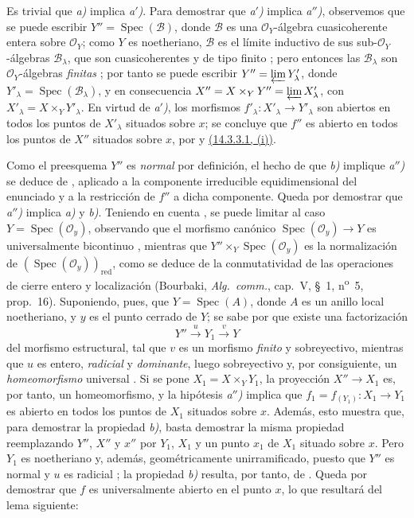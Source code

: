 Es trivial que \emph{a)} implica \emph{a$'$)}.
Para demostrar que \emph{a$'$)} implica \emph{a$''$)}, observemos que se puede escribir $Y''=\operatorname{Spec}(\mathcal B)$, donde $\mathcal B$ es una $\mathcal O_Y$-álgebra cuasicoherente entera sobre $\mathcal O_Y$; como $Y$ es noetheriano, $\mathcal B$ es el límite inductivo de sus sub-$\mathcal O_Y$-álgebras $\mathcal B_\lambda$, que son cuasicoherentes y de tipo finito ; pero entonces las $\mathcal B_\lambda$ son $\mathcal O_Y$-álgebras \emph{finitas} ; por tanto se puede escribir $Y''=\varprojlim Y'_\lambda$, donde $Y'_\lambda=\operatorname{Spec}(\mathcal B_\lambda)$, y en consecuencia $X''=X\times_Y Y''=\varprojlim X'_\lambda$, con $X'_\lambda=X\times_Y Y'_\lambda$.
En virtud de \emph{a$'$)}, los morfismos $f'_\lambda:X'_\lambda\to Y'_\lambda$ son abiertos en todos los puntos de $X'_\lambda$ situados sobre $x$; se concluye que $f''$ es abierto en todos los puntos de $X''$ situados sobre $x$, por  y {\hyperlink{ega4.c04.subsec.14-3-3-1}{(14.3.3.1, (i))}}.

Como el preesquema $Y''$ es \emph{normal} por definición, el hecho de que \emph{b)} implique \emph{a$''$)} se deduce de , aplicado a la componente irreducible equidimensional del enunciado y a la restricción de $f''$ a dicha componente.
Queda por demostrar que \emph{a$''$)} implica \emph{a)} y \emph{b)}.
Teniendo en cuenta , se puede limitar al caso $Y=\operatorname{Spec}(\mathcal O_y)$, observando que el morfismo canónico $\operatorname{Spec}(\mathcal O_y)\to Y$ es universalmente bicontinuo , mientras que $Y''\times_Y\operatorname{Spec}(\mathcal O_y)$ es la normalización de $(\operatorname{Spec}(\mathcal O_y))_{\mathrm{red}}$, como se deduce de la conmutatividad de las operaciones de cierre entero y localización (Bourbaki, \emph{Alg.\ comm.}, cap.~V, \S~1, n\textsuperscript{o}~5, prop.~16).
Suponiendo, pues, que $Y=\operatorname{Spec}(A)$, donde $A$ es un anillo local noetheriano, y $y$ es el punto cerrado de $Y$; se sabe por  que existe una factorización
\[
  Y''\xrightarrow{u}Y_1\xrightarrow{v}Y
\]
del morfismo estructural, tal que $v$ es un morfismo \emph{finito} y sobreyectivo, mientras que $u$ es entero, \emph{radicial} y \emph{dominante}, luego sobreyectivo  y, por consiguiente, un \emph{homeomorfismo} universal .
Si se pone $X_1=X\times_Y Y_1$, la proyección $X''\to X_1$ es, por tanto, un homeomorfismo, y la hipótesis \emph{a$''$)} implica que $f_1=f_{(Y_1)}:X_1\to Y_1$ es abierto en todos los puntos de $X_1$ situados sobre $x$.
Además, esto muestra que, para demostrar la propiedad \emph{b)}, basta demostrar la misma propiedad reemplazando $Y''$, $X''$ y $x''$ por $Y_1$, $X_1$ y un punto $x_1$ de $X_1$ situado sobre $x$.
Pero $Y_1$ es noetheriano y, además, geométricamente unirramificado, puesto que $Y''$ es normal y $u$ es radicial ; la propiedad \emph{b)} resulta, por tanto, de .
Queda por demostrar que $f$ es universalmente abierto en el punto $x$, lo que resultará del lema siguiente:

